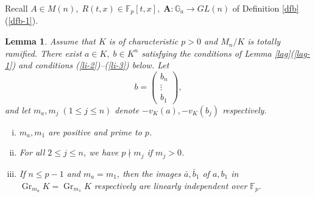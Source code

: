 \documentclass[sn-mathphys-num]{sn-jnl}
\numberwithin{equation}{section}
\newcommand{\Gr}{\operatorname{Gr}}
\theoremstyle{plain}
\newtheorem{lemm}[theo]{Lemma}
\theoremstyle{definition}
\begin{document}
Recall $A\in M(n),\;R(t,x)\in\mathbb{F}_p[t,x],\;\mathbf{A}:\mathbb{G}_a\to GL(n)$ of Definition \ref{dfb}(\ref{dfb-1}).

\begin{lemm}\label{li}
Assume that $K$ is of characteristic $p>0$ and $M_n/K$ is totally ramified. There exist $a\in K,\;b\in K^n$ satisfying the conditions of Lemma \ref{lag}(\ref{lag-1}) and conditions (\ref{li-2})--(\ref{li-3}) below. Let
\begin{equation}\label{ev}
b=
\begin{pmatrix}
  b_n\\
  \vdots\\
  b_1
\end{pmatrix},
\end{equation}
and let $m_a,m_j\;(1\leq j\leq n)$ denote $-v_K(a), -v_K(b_j)$ respectively.  
\begin{enumerate}[(i)]
\item\label{li-2} $m_a,m_1$ are positive and prime to $p$.
\item\label{li-1} For all $2\leq j\leq n$, we have $p\nmid m_j$ if $m_j>0$.
\item\label{li-3} If $n\leq p-1$ and $m_a=m_1$, then the images $\bar{a},\bar{b}_1$ of $a,b_1$ in $\Gr_{m_a}K=\Gr_{m_1}K$ respectively are linearly independent over $\mathbb{F}_p$.
  \end{enumerate}
\end{lemm}
\end{document}
